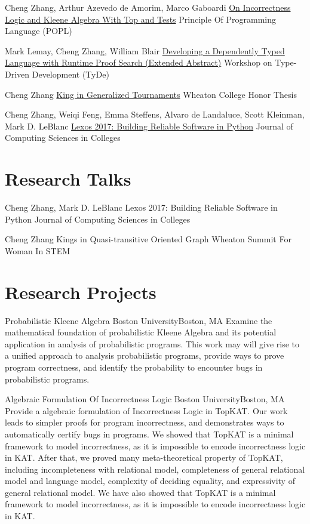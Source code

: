 \documentclass[11pt,roman]{moderncv}        %
\begin{document}
{Cheng Zhang, Arthur Azevedo de Amorim, Marco Gaboardi}
{\href{https://arxiv.org/abs/2108.07707}{On Incorrectness Logic and Kleene Algebra With Top and Tests}}
{Principle Of Programming Language (POPL)}
{}{}

{Mark Lemay, Cheng Zhang, William Blair}
{\href{https://icfp20.sigplan.org/details/tyde-2020-papers/7/Developing-a-Dependently-Typed-Language-with-Runtime-Proof-Search-Extended-Abstract-}
{Developing a Dependently Typed Language with Runtime Proof Search (Extended Abstract)}}
{Workshop on Type-Driven Development (TyDe)}
{}{}

{Cheng Zhang}
{\href{http://hdl.handle.net/11040/24570}{King in Generalized Tournaments}}
{Wheaton College Honor Thesis}
{}{}

{Cheng Zhang, Weiqi Feng, Emma Steffens, Alvaro de Landaluce, Scott Kleinman, Mark D. LeBlanc}
{\href{https://dl.acm.org/doi/10.5555/3205191.3205205}{Lexos 2017: Building Reliable Software in Python}}
{Journal of Computing Sciences in Colleges}
{}{}


\section{Research Talks}

{Cheng Zhang, Mark D. LeBlanc}
{Lexos 2017: Building Reliable Software in Python}
{Journal of Computing Sciences in Colleges}
{}{}

{Cheng Zhang}
{Kings in Quasi-transitive Oriented Graph}
{Wheaton Summit For Woman In STEM}
{}{}


\section{Research Projects}

{Probabilistic Kleene Algebra}
{Boston University}{Boston, MA}{}
{Examine the mathematical foundation of probabilistic Kleene Algebra 
and its potential application in analysis of probabilistic programs.
This work \iftechnical may \else will \fi 
give rise to a unified approach to analysis probabilistic programs,
provide ways to prove program correctness, 
and identify the probability to encounter bugs in probabilistic programs.}

{Algebraic Formulation Of Incorrectness Logic}
{Boston University}{Boston, MA}{}
{Provide a algebraic formulation of Incorrectness Logic in TopKAT.
Our work leads to simpler proofs for program incorrectness, 
and demonstrates ways to automatically certify bugs in programs.
\iftechnical
We showed that 
TopKAT is a minimal framework to model incorrectness,
as it is impossible to encode incorrectness logic in KAT.
After that, we proved many meta-theoretical property of TopKAT,
including incompleteness with relational model, 
completeness of general relational model and language model, 
complexity of deciding equality, and expressivity of general relational model.
\else 
We have also showed that 
TopKAT is a minimal framework to model incorrectness,
as it is impossible to encode incorrectness logic in KAT.
\fi
}
\end{document}
